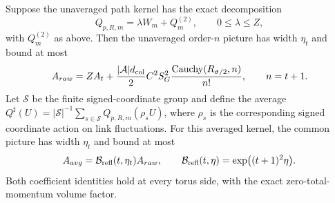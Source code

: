 \begin{corollary}
\label{cor:ex-row-controlled-action}
Suppose the unaveraged path kernel has the exact decomposition
\[
 Q_{p,R,m}=\lambda W_m+Q^{(2)}_m,\qquad 0\leq\lambda\leq Z,
\]
with $Q^{(2)}_m$ as above. Then the unaveraged order-$n$ picture has width
$\eta_t$ and bound at most
\[
 A_{raw}=ZA_t+\frac{|\mathcal A|d_{\rm col}}{2}C^2S_G^2
       \frac{\operatorname{Cauchy}(R_{\sigma/2},n)}{n!},
       \qquad n=t+1.
\]
Let $\mathcal S$ be the finite signed-coordinate group and define the
average $Q^\sharp(U)=|\mathcal S|^{-1}\sum_{s\in\mathcal S}Q_{p,R,m}(\rho_sU)$,
where $\rho_s$ is the corresponding signed coordinate action on link
fluctuations. For this averaged kernel, the common picture has width $\eta_t$ and bound
at most
\[
 A_{avg}=\mathcal B_{\rm refl}(t,\eta_t)A_{raw},\qquad
 \mathcal B_{\rm refl}(t,\eta)=\exp\bigl((t+1)^2\eta\bigr).
\]
Both coefficient identities hold at every torus side, with the exact
zero-total-momentum volume factor.
\end{corollary}

